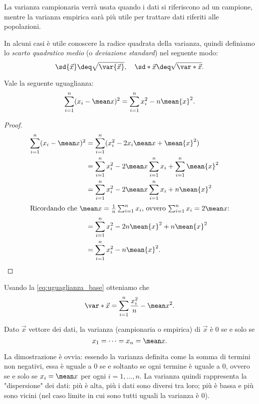 La varianza campionaria verrà usata quando i dati si riferiscono ad un campione, mentre la varianza empirica sarà più utile per trattare dati riferiti alle popolazioni.

In alcuni casi è utile conoscere la radice quadrata della varianza, quindi definiamo lo \emph{scarto quadratico medio} (o \emph{deviazione standard}) nel seguente modo: \begin{equation}
    \sd{\vec x} \deq \sqrt{\var{\vec x}}, \quad \sd*{\vec x} \deq \sqrt{\var*{\vec x}}.
\end{equation}

\begin{proposition}
    Vale la seguente uguaglianza: \begin{equation} \label{eq:uguaglianza_base}
        \sum_{i=1}^n (x_i - \mean x)^2 = \sum_{i=1}^n x_i^2 - n\mean{x}^2.
    \end{equation}
\end{proposition}
\begin{proof}
    \begin{align*}
        \sum_{i=1}^n (x_i - \mean x)^2 &= \sum_{i=1}^n (x_i^2 - 2x_i\mean x + \mean{x}^2)\\
        &= \sum_{i=1}^n x_i^2 - 2\mean x\sum_{i=1}^n x_i + \sum_{i=1}^n \mean{x}^2\\
        &= \sum_{i=1}^n x_i^2 - 2\mean x\sum_{i=1}^n x_i + n\mean{x}^2\\
        \intertext{Ricordando che $\mean x = \frac1n \sum_{i=1}^n x_i$, ovvero $\sum_{i=1}^n x_i = 2\mean x$:}
        &= \sum_{i=1}^n x_i^2 - 2n\mean{x}^2 + n\mean{x}^2\\
        &= \sum_{i=1}^n x_i^2 - n\mean{x}^2. \qedhere
    \end{align*}
\end{proof}

Usando la \eqref{eq:uguaglianza_base} otteniamo che \[
    \var*{\vec x} = \sum_{i=1}^n \frac{x_i^2}{n} - \mean x^2.
\]

\begin{proposition}
    Dato $\vec x$ vettore dei dati, la varianza (campionaria o empirica) di $\vec x$ è $0$ se e solo se \[
        x_1 = \dots = x_n = \mean x.    
    \]
\end{proposition}
La dimostrazione è ovvia: essendo la varianza definita come la somma di termini non negativi, essa è uguale a $0$ se e soltanto se ogni termine è uguale a $0$, ovvero se e solo se $x_i = \mean x$ per ogni $i = 1, \dots, n$. La varianza quindi rappresenta la "dispersione" dei dati: più è alta, più i dati sono diversi tra loro; più è bassa e più sono vicini (nel caso limite in cui sono tutti uguali la varianza è $0$).

